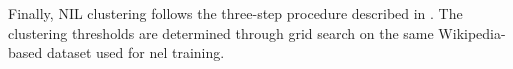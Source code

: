 Finally, NIL clustering follows the three-step procedure described in .  
The clustering thresholds are determined through grid search on the same Wikipedia-based dataset used for \ac{nel} training.















